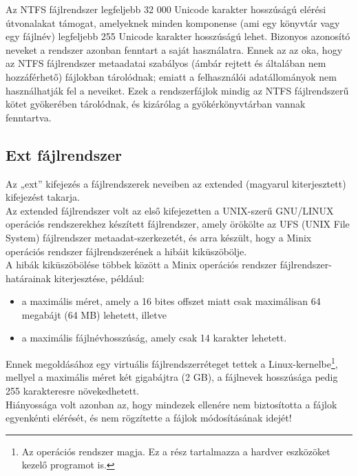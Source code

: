 \documentclass[tikz,12pt,margin=0px]{article}
\begin{document}
    \noindent Az NTFS fájlrendszer legfeljebb 32 000 Unicode karakter hosszúságú elérési útvonalakat támogat, amelyeknek minden komponense (ami egy könyvtár vagy egy fájlnév) legfeljebb 255 Unicode karakter hosszúságú lehet. Bizonyos azonosító neveket a rendszer azonban fenntart a saját használatra. Ennek az az oka, hogy az NTFS fájlrendszer metaadatai szabályos (ámbár rejtett és általában nem hozzáférhető) fájlokban tárolódnak; emiatt a felhasználói adatállományok nem használhatják fel a neveiket. Ezek a rendszerfájlok mindig az NTFS fájlrendszerű kötet gyökerében tárolódnak, és kizárólag a gyökérkönyvtárban vannak fenntartva.\\

	\subsection*{Ext fájlrendszer}

    \noindent Az „ext” kifejezés a fájlrendszerek neveiben az extended (magyarul kiterjesztett) kifejezést takarja. \\

    \noindent Az extended fájlrendszer volt az első kifejezetten a UNIX-szerű GNU/LINUX operációs rendszerekhez készített fájlrendszer, amely örökölte az UFS (UNIX File System) fájlrendszer metaadat-szerkezetét, és arra készült, hogy a Minix operációs rendszer fájlrendszerének a hibáit kiküszöbölje.\\

    \noindent A hibák kiküszöbölése többek között a Minix operációs rendszer fájlrendszer-határainak kiterjesztése, például:
    \begin{itemize}
        \item a maximális méret, amely a 16 bites offszet miatt csak maximálisan 64 megabájt (64 MB) lehetett, illetve
        \item a maximális fájlnévhosszúság, amely csak 14 karakter lehetett.
    \end{itemize}
    Ennek megoldásához egy virtuális fájlrendszerréteget tettek a Linux-kernelbe\footnote{Az operációs rendszer magja. Ez a rész tartalmazza a hardver eszközöket kezelő programot is.}, mellyel a maximális méret két gigabájtra (2 GB), a fájlnevek hosszúsága pedig 255 karakteresre növekedhetett.\\

    \noindent Hiányossága volt azonban az, hogy mindezek ellenére nem biztosította a fájlok egyenkénti elérését, és nem rögzítette a fájlok módosításának idejét!
\end{document}
